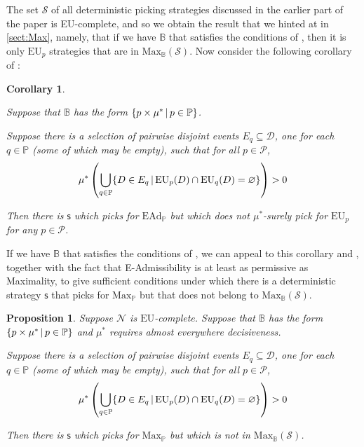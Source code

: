 \documentclass[a4paper,final]{article}
\newtheorem{proposition}[theorem]{Proposition}
\newtheorem{corollary}[theorem]{Corollary}
\renewcommand\P{\mathbb{P}} %
\newcommand\Prob{\mathcal{P}} %
\newcommand\EU{\mathrm{EU}}
\newcommand\EAd{\mathrm{EAd}}
\newcommand\Maximality{\mathrm{Max}}
\newcommand{\Decs}{\mathcal{D}}
\renewcommand\S{\mathcal{S}}
\newcommand\s{\mathsf{s}}
\newcommand\Nu{\mathcal{N}}
\newcommand{\IB}{\mathbb{B}}
\newcommand{\IP}{\P}
\renewcommand{\color}[1]{}
\newenvironment{colored}[1]{\leavevmode\color{#1}}{}
\newcommand\SetDelimiter[1][]{
	\nonscript\,#1\vert \allowbreak \nonscript\,\mathopen{}}
\providecommand\given{\SetDelimiter}
\renewcommand{\emptyset}{\varnothing}
\newenvironment{CCM rewritten}
{\begingroup\color{blue}} %
{\endgroup}              %
\begin{document}
The set $\S$ of all deterministic picking strategies discussed in the earlier part of the paper is EU-complete, and so we obtain the result that we hinted at in \cref{sect:Max}, namely, that if we have $\IB$ that satisfies the conditions of , then it is only $\EU_p$ strategies that are in $\Maximality_\IB(\S)$. \begin{colored}{blue} Now consider the following corollary of :



\begin{corollary}\label{thm:ead-existsimpermissible[indep]-corr}

 Suppose that $\IB$ has the form $\{p\times \mu^*\given p\in \IP\}$.

Suppose there is a selection of pairwise disjoint events $E_q\subseteq\Decs$, one for each $q\in\IP$ (some of which may be empty), such that for all $p\in\Prob$, 
\[
\mu^*\left(\bigcup_{q\in\IP}\{D\in E_q\given \EU_p(D)\cap\EU_q(D)=\emptyset\}\right)>0
\]

Then there is $\s$ which picks for $\EAd_\IP$ but which does not $\mu^*$-surely pick for $\EU_p$ for any $p\in\Prob$.

\end{corollary}

If we have $\IB$ that satisfies the conditions of , we can appeal to this corollary and , together with the fact that E-Admissibility is at least as permissive as Maximality, to give sufficient conditions under which there is a deterministic strategy $\s$ that picks for $\Maximality_{\IP}$ but that does not belong to $\Maximality_\IB(\S)$.




\begin{proposition}\label{thm:max-existsimpermissible[dep]}
	Suppose $\Nu$ is $\EU$-complete. Suppose that 
	$\IB$ has the form $\{p\times \mu^*\given p\in \IP\}$ and $\mu^*$ requires almost everywhere decisiveness.

Suppose there is a selection of pairwise disjoint events $E_q\subseteq\Decs$, one for each $q\in\IP$ (some of which may be empty), such that for all $p\in\Prob$, 
\[
\mu^*\left(\bigcup_{q\in\IP}\{D\in E_q\given \EU_p(D)\cap\EU_q(D)=\emptyset\}\right)>0
\]

	
	Then there is $\s$ which picks for $\Maximality_\IP$ but which is not in $\Maximality_\IB(\S)$. 
\end{proposition}






\end{colored}
\end{document}
